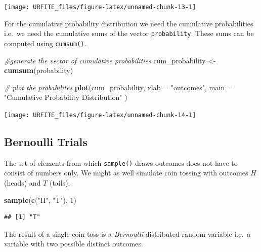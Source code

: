 \documentclass[]{book}
\newenvironment{Shaded}{\begin{snugshade}}{\end{snugshade}}
\newcommand{\KeywordTok}[1]{\textcolor[rgb]{0.13,0.29,0.53}{\textbf{#1}}}
\newcommand{\DataTypeTok}[1]{\textcolor[rgb]{0.13,0.29,0.53}{#1}}
\newcommand{\DecValTok}[1]{\textcolor[rgb]{0.00,0.00,0.81}{#1}}
\newcommand{\StringTok}[1]{\textcolor[rgb]{0.31,0.60,0.02}{#1}}
\newcommand{\CommentTok}[1]{\textcolor[rgb]{0.56,0.35,0.01}{\textit{#1}}}
\newcommand{\NormalTok}[1]{#1}
\theoremstyle{definition}
\theoremstyle{definition}
\theoremstyle{definition}
\theoremstyle{remark}
\begin{document}
\begin{center}\texttt{[image: URFITE\_files/figure-latex/unnamed-chunk-13-1]} \end{center}

For the cumulative probability distribution we need the cumulative
probabilities i.e.~we need the cumulative sums of the vector
\texttt{probability}. These sums can be computed using
\texttt{cumsum()}.

\begin{Shaded}
\begin{Highlighting}[]
\CommentTok{#generate the vector of cumulative probabilities }
\NormalTok{cum_probability <-}\StringTok{ }\KeywordTok{cumsum}\NormalTok{(probability) }

\CommentTok{# plot the probabilites }
\KeywordTok{plot}\NormalTok{(cum_probability, }
     \DataTypeTok{xlab =} \StringTok{"outcomes"}\NormalTok{, }
     \DataTypeTok{main =} \StringTok{"Cumulative Probability Distribution"}
\NormalTok{     ) }
\end{Highlighting}
\end{Shaded}

\begin{center}\texttt{[image: URFITE\_files/figure-latex/unnamed-chunk-14-1]} \end{center}

\subsection*{Bernoulli Trials}\label{bernoulli-trials}

The set of elements from which \texttt{sample()} draws outcomes does not
have to consist of numbers only. We might as well simulate coin tossing
with outcomes \(H\) (heads) and \(T\) (tails).

\begin{Shaded}
\begin{Highlighting}[]
\KeywordTok{sample}\NormalTok{(}\KeywordTok{c}\NormalTok{(}\StringTok{"H"}\NormalTok{, }\StringTok{"T"}\NormalTok{), }\DecValTok{1}\NormalTok{) }
\end{Highlighting}
\end{Shaded}

\begin{verbatim}
## [1] "T"
\end{verbatim}

The result of a single coin toss is a \emph{Bernoulli} distributed
random variable i.e.~a variable with two possible distinct outcomes.
\end{document}
